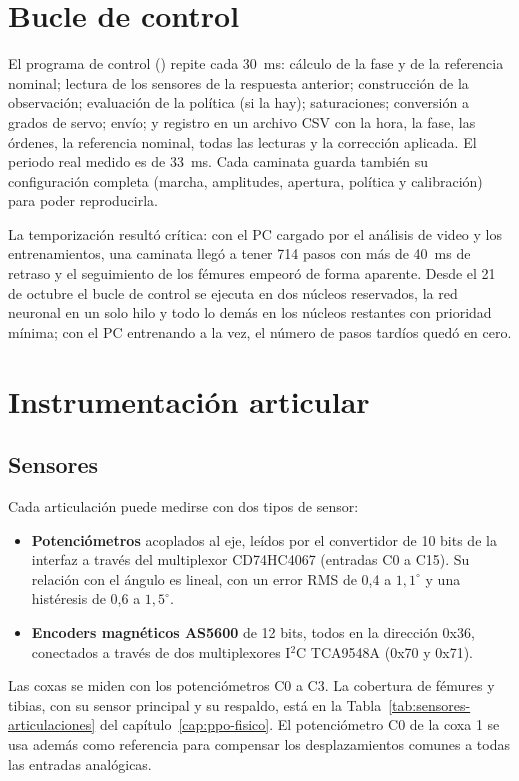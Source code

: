 \section{Bucle de control}

El programa de control () repite cada 30~ms: cálculo de la
fase y de la referencia nominal; lectura de los sensores de la respuesta
anterior; construcción de la observación; evaluación de la política (si la hay);
saturaciones; conversión a grados de servo; envío; y registro en un archivo CSV
con la hora, la fase, las órdenes, la referencia nominal, todas las lecturas y la
corrección aplicada. El periodo real medido es de 33~ms. Cada caminata guarda
también su configuración completa (marcha, amplitudes, apertura, política y
calibración) para poder reproducirla.

La temporización resultó crítica: con el PC cargado por el análisis de video y
los entrenamientos, una caminata llegó a tener 714 pasos con más de 40~ms de
retraso y el seguimiento de los fémures empeoró de forma aparente. Desde el 21
de octubre el bucle de control se ejecuta en dos núcleos reservados, la red
neuronal en un solo hilo y todo lo demás en los núcleos restantes con
prioridad mínima; con el PC entrenando a la vez, el número de pasos tardíos
quedó en cero.

\section{Instrumentación articular}

\subsection{Sensores}

Cada articulación puede medirse con dos tipos de sensor:
\begin{itemize}
    \item \textbf{Potenciómetros} acoplados al eje, leídos por el convertidor de
    10 bits de la interfaz a través del multiplexor CD74HC4067 (entradas C0 a C15). Su
    relación con el ángulo es lineal, con un error RMS de 0,4 a $1{,}1^\circ$ y
    una histéresis de 0,6 a $1{,}5^\circ$.
    \item \textbf{Encoders magnéticos AS5600} de 12 bits, todos en la dirección
    0x36, conectados a través de dos multiplexores I$^2$C TCA9548A (0x70 y 0x71).
\end{itemize}
Las coxas se miden con los potenciómetros C0 a C3. La cobertura de fémures y
tibias, con su sensor principal y su respaldo, está en la
Tabla~\ref{tab:sensores-articulaciones} del capítulo~\ref{cap:ppo-fisico}. El
potenciómetro C0 de la coxa 1 se usa además como referencia para compensar los
desplazamientos comunes a todas las entradas analógicas.

